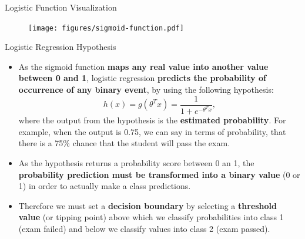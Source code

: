 \documentclass[document.tex]{subfiles}
\begin{document}
    \begin{frame}{Logistic Function Visualization}
        \begin{figure}
            \label{fig:sigmoid-function}
            \texttt{[image: figures/sigmoid-function.pdf]}
        \end{figure}
    \end{frame}

    \begin{frame}{Logistic Regression Hypothesis}
        \begin{itemize}
            \item As the sigmoid function \textbf{maps any real value into another value between 0 and 1}, logistic regression \textbf{predicts the probability of occurrence of any binary event}, by using the following hypothesis:
            $$h(x) = g(\theta^Tx) = \frac{1}{1 + e^{-\theta^Tx}},$$
            where the output from the hypothesis is the \textbf{estimated probability}. For example, when the output is 0.75, we can say in terms of probability, that there is a 75\% chance that the student will pass the exam.
            \item As the hypothesis returns a probability score between 0 an 1, the \textbf{probability prediction must be transformed into a binary value} (0 or 1) in order to actually make a class predictions.
            \item Therefore we must set a \textbf{decision boundary} by selecting a \textbf{threshold value} (or tipping point) above which we classify probabilities into class 1 (exam failed) and below we classify values into class 2 (exam passed).
        \end{itemize}
    \end{frame}
\end{document}
